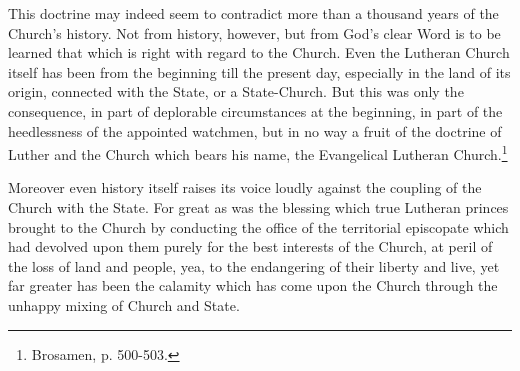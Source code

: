                 This doctrine may indeed seem to contradict more than a thousand years of the Church’s history.  Not from history, however, but from God’s clear Word is to be learned that which is right with regard to the Church.  Even the Lutheran Church itself has been from the beginning till the present day, especially in the land of its origin, connected with the State, or a State-Church.  But this was only the consequence, in part of deplorable circumstances at the beginning, in part of the heedlessness of the appointed watchmen, but in no way a fruit of the doctrine of Luther and the Church which bears his name, the Evangelical Lutheran Church.\footnote{Brosamen, p. 500-503.} {\color{black}\par Moreover even history itself raises its voice loudly against the coupling of the Church with the State.  For great as was the blessing which true Lutheran princes brought to the Church by conducting the office of the territorial episcopate which had devolved upon them purely for the best interests of the Church, at peril of the loss of land and people, yea, to the endangering of their liberty and live, yet far greater has been the calamity which has come upon the Church through the unhappy mixing of Church and State.

}
